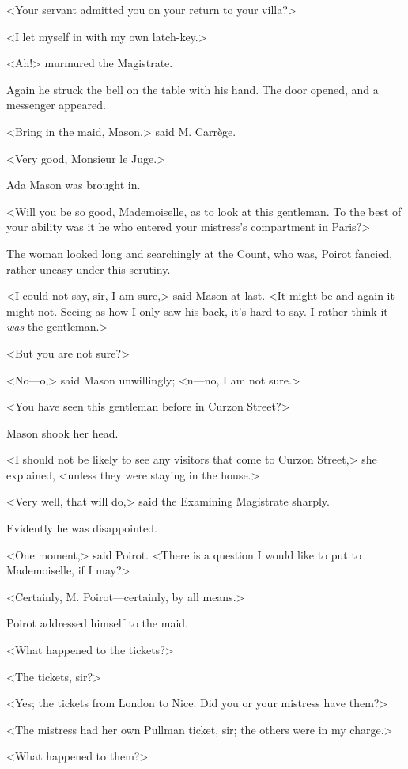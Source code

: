 <Your servant admitted you on your return to your villa?>

<I let myself in with my own latch-key.>

<Ah!> murmured the Magistrate.

Again he struck the bell on the table with his hand. The door opened, and a messenger appeared.

<Bring in the maid, Mason,> said M. Carrège.

<Very good, Monsieur le Juge.>

Ada Mason was brought in.

<Will you be so good, Mademoiselle, as to look at this gentleman. To the best of your ability was it he who entered your mistress's compartment in Paris?>

The woman looked long and searchingly at the Count, who was, Poirot fancied, rather uneasy under this scrutiny.

<I could not say, sir, I am sure,> said Mason at last. <It might be and again it might not. Seeing as how I only saw his back, it's hard to say. I rather think it \emph{was} the gentleman.>

<But you are not sure?>

<No—o,> said Mason unwillingly; <n—no, I am not sure.>

<You have seen this gentleman before in Curzon Street?>

Mason shook her head.

<I should not be likely to see any visitors that come to Curzon Street,> she explained, <unless they were staying in the house.>

<Very well, that will do,> said the Examining Magistrate sharply.

Evidently he was disappointed.

<One moment,> said Poirot. <There is a question I would like to put to Mademoiselle, if I may?>

<Certainly, M. Poirot—certainly, by all means.>

Poirot addressed himself to the maid.

<What happened to the tickets?>

<The tickets, sir?>

<Yes; the tickets from London to Nice. Did you or your mistress have them?>

<The mistress had her own Pullman ticket, sir; the others were in my charge.>

<What happened to them?>

